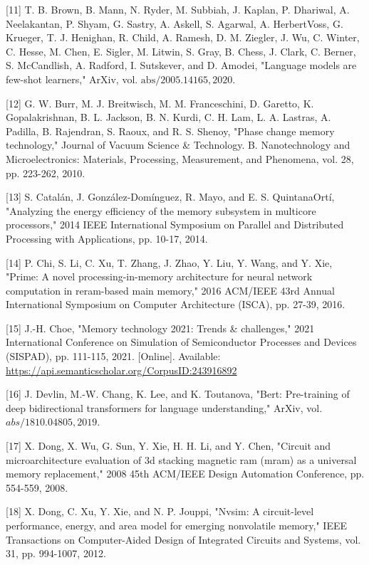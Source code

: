 \documentclass[10pt]{article}
\begin{document}
[11] T. B. Brown, B. Mann, N. Ryder, M. Subbiah, J. Kaplan, P. Dhariwal, A. Neelakantan, P. Shyam, G. Sastry, A. Askell, S. Agarwal, A. HerbertVoss, G. Krueger, T. J. Henighan, R. Child, A. Ramesh, D. M. Ziegler, J. Wu, C. Winter, C. Hesse, M. Chen, E. Sigler, M. Litwin, S. Gray, B. Chess, J. Clark, C. Berner, S. McCandlish, A. Radford, I. Sutskever, and D. Amodei, "Language models are few-shot learners," ArXiv, vol. $\mathrm{abs} / 2005.14165,2020$.

[12] G. W. Burr, M. J. Breitwisch, M. M. Franceschini, D. Garetto, K. Gopalakrishnan, B. L. Jackson, B. N. Kurdi, C. H. Lam, L. A. Lastras, A. Padilla, B. Rajendran, S. Raoux, and R. S. Shenoy, "Phase change memory technology," Journal of Vacuum Science \& Technology. B. Nanotechnology and Microelectronics: Materials, Processing, Measurement, and Phenomena, vol. 28, pp. 223-262, 2010.

[13] S. Catalán, J. González-Domínguez, R. Mayo, and E. S. QuintanaOrtí, "Analyzing the energy efficiency of the memory subsystem in multicore processors," 2014 IEEE International Symposium on Parallel and Distributed Processing with Applications, pp. 10-17, 2014.

[14] P. Chi, S. Li, C. Xu, T. Zhang, J. Zhao, Y. Liu, Y. Wang, and Y. Xie, "Prime: A novel processing-in-memory architecture for neural network computation in reram-based main memory," 2016 ACM/IEEE 43rd Annual International Symposium on Computer Architecture (ISCA), pp. 27-39, 2016.

[15] J.-H. Choe, "Memory technology 2021: Trends \& challenges," 2021 International Conference on Simulation of Semiconductor Processes and Devices (SISPAD), pp. 111-115, 2021. [Online]. Available: \href{https://api.semanticscholar.org/CorpusID:243916892}{https://api.semanticscholar.org/CorpusID:243916892}

[16] J. Devlin, M.-W. Chang, K. Lee, and K. Toutanova, "Bert: Pre-training of deep bidirectional transformers for language understanding," ArXiv, vol. $a b s / 1810.04805,2019$.

[17] X. Dong, X. Wu, G. Sun, Y. Xie, H. H. Li, and Y. Chen, "Circuit and microarchitecture evaluation of 3d stacking magnetic ram (mram) as a universal memory replacement," 2008 45th ACM/IEEE Design Automation Conference, pp. 554-559, 2008.

[18] X. Dong, C. Xu, Y. Xie, and N. P. Jouppi, "Nvsim: A circuit-level performance, energy, and area model for emerging nonvolatile memory," IEEE Transactions on Computer-Aided Design of Integrated Circuits and Systems, vol. 31, pp. 994-1007, 2012.
\end{document}
